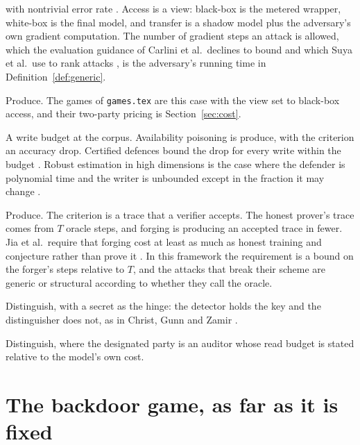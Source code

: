 \documentclass[11pt]{article}
\theoremstyle{definition}
\theoremstyle{plain}
\theoremstyle{remark}
\begin{document}
\begin{description}
        with nontrivial error rate \cite{GMFSRWG18}. Access is a view: black-box is the metered wrapper,
        white-box is the final model, and transfer is a shadow model plus the
        adversary's own gradient computation. The number of gradient steps an
        attack is allowed, which the evaluation guidance of Carlini et al.\ declines
        to bound \cite{CAPBRTGMK19} and which Suya et al.\ use to rank attacks
        \cite{SSZHTE24}, is the adversary's running time in
        Definition~\ref{def:generic}.
  \item[Extraction.] Produce. The games of \texttt{games.tex} are this case with
        the view set to black-box access, and their two-party pricing is
        Section~\ref{sec:cost}.
  \item[Poisoning.] A write budget at the corpus. Availability poisoning is
        produce, with the criterion an accuracy drop. Certified defences bound the
        drop for every write within the budget \cite{SKL17}. Robust estimation in
        high dimensions is the case where the defender is polynomial time and the
        writer is unbounded except in the fraction it may change
        \cite{DKKLMS16}.
  \item[Proof-of-learning.] Produce. The criterion is a trace that a verifier
        accepts. The honest prover's trace comes from $T$ oracle steps, and forging
        is producing an accepted trace in fewer. Jia et al.\ require that forging
        cost at least as much as honest training and conjecture rather than prove
        it \cite{JYCDTCP21}. In this framework the requirement is a bound on the
        forger's steps relative to $T$, and the attacks that break their scheme
        \cite{FJTYCDCP23} are generic or structural according to whether they call
        the oracle.
  \item[Watermarking.] Distinguish, with a secret as the hinge: the detector holds
        the key and the distinguisher does not, as in Christ, Gunn and Zamir
        \cite{CGZ23}.
  \item[Filtering and auditing.] Distinguish, where the designated party is an
        auditor whose read budget is stated relative to the model's own cost.
\end{description}

\section{The backdoor game, as far as it is fixed}
\label{sec:backdoor}
\end{document}
